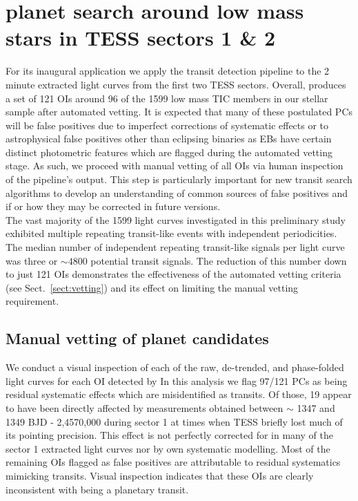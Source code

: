 \section{\pipeline{} planet search around low mass stars in TESS sectors 1 \& 2} \label{sect:search}
For its inaugural application we apply the \pipeline{} transit detection pipeline to the
2 minute extracted light curves from the first two TESS sectors. 
Overall, \pipeline{} produces a set of 121 OIs around 96 of the 1599 low mass TIC members in our stellar
sample after automated vetting.
It is expected that many of these postulated PCs will be false positives due to
imperfect corrections of systematic effects or to astrophysical false positives other than eclipsing
binaries as EBs have certain distinct photometric features which are flagged during the automated 
vetting stage. As such, we proceed with manual vetting of all \pipeline{} OIs via human inspection
of the pipeline's output. This step is particularly important for new transit
search algorithms to develop an understanding of common sources of false positives and if or how
they may be corrected in future versions. \\

The vast majority of the 1599 light curves investigated in this preliminary study exhibited
multiple repeating transit-like events with independent periodicities. The median number of independent
repeating transit-like signals per light curve was three or $\sim 4800$ potential transit signals.
The reduction of this number down to just 121 OIs demonstrates the effectiveness of the \pipeline{}
automated vetting criteria (see Sect.~\ref{sect:vetting}) and its effect on limiting the 
manual vetting requirement.


\subsection{Manual vetting of \pipeline{} planet candidates} \label{sect:manual}
We conduct a visual inspection of each of the raw, de-trended, and phase-folded light curves for
each OI detected by  
In this analysis we flag 97/121 PCs as being residual systematic effects which are
misidentified as transits. Of those, 19 appear to have been directly affected by measurements
obtained between $\sim$ 1347 and 1349 BJD - 2,4570,000 during sector 1 at times when TESS briefly lost much
of its pointing precision. This effect is not perfectly corrected for in many of the sector 1 extracted light
curves nor by  own systematic modelling. Most of the remaining OIs flagged as false positives are attributable
to residual systematics mimicking transits. Visual inspection indicates that these OIs are clearly
inconsistent with being a planetary transit. \\

